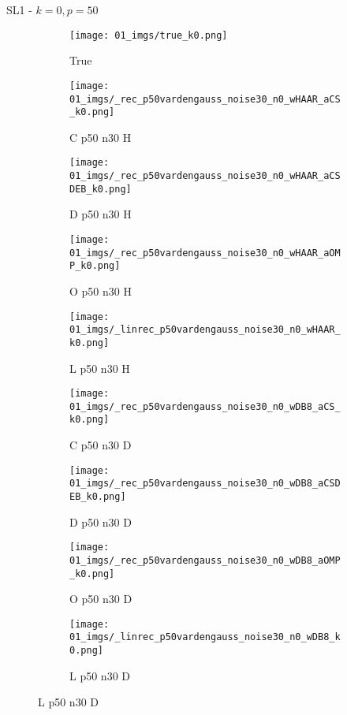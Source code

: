 \begin{frame}{SL1 - $k=0,p=50$}{}
\begin{figure}
\begin{subfigure}{0.1\textwidth}
\texttt{[image: 01\_imgs/true\_k0.png]}
\caption*{\Tiny True}
\end{subfigure}
\begin{subfigure}{0.1\textwidth}
\texttt{[image: 01\_imgs/\_rec\_p50vardengauss\_noise30\_n0\_wHAAR\_aCS\_k0.png]}
\caption*{\Tiny C p50 n30 H}
\end{subfigure}
\begin{subfigure}{0.1\textwidth}
\texttt{[image: 01\_imgs/\_rec\_p50vardengauss\_noise30\_n0\_wHAAR\_aCSDEB\_k0.png]}
\caption*{\Tiny D p50 n30 H}
\end{subfigure}
\begin{subfigure}{0.1\textwidth}
\texttt{[image: 01\_imgs/\_rec\_p50vardengauss\_noise30\_n0\_wHAAR\_aOMP\_k0.png]}
\caption*{\Tiny O p50 n30 H}
\end{subfigure}
\begin{subfigure}{0.1\textwidth}
\texttt{[image: 01\_imgs/\_linrec\_p50vardengauss\_noise30\_n0\_wHAAR\_k0.png]}
\caption*{\Tiny L p50 n30 H}
\end{subfigure}
\begin{subfigure}{0.1\textwidth}
\texttt{[image: 01\_imgs/\_rec\_p50vardengauss\_noise30\_n0\_wDB8\_aCS\_k0.png]}
\caption*{\Tiny C p50 n30 D}
\end{subfigure}
\begin{subfigure}{0.1\textwidth}
\texttt{[image: 01\_imgs/\_rec\_p50vardengauss\_noise30\_n0\_wDB8\_aCSDEB\_k0.png]}
\caption*{\Tiny D p50 n30 D}
\end{subfigure}
\begin{subfigure}{0.1\textwidth}
\texttt{[image: 01\_imgs/\_rec\_p50vardengauss\_noise30\_n0\_wDB8\_aOMP\_k0.png]}
\caption*{\Tiny O p50 n30 D}
\end{subfigure}
\begin{subfigure}{0.1\textwidth}
\texttt{[image: 01\_imgs/\_linrec\_p50vardengauss\_noise30\_n0\_wDB8\_k0.png]}
\caption*{\Tiny L p50 n30 D}
\end{subfigure}
\end{figure}
\end{frame}



